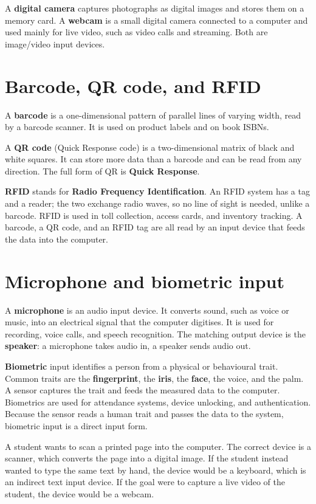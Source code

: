 A \textbf{digital camera} captures photographs as digital images and stores
them on a memory card. A \textbf{webcam} is a small digital camera connected
to a computer and used mainly for live video, such as video calls and
streaming. Both are image/video input devices.

\section{Barcode, QR code, and RFID}
A \textbf{barcode} is a one-dimensional pattern of parallel lines of varying
width, read by a barcode scanner. It is used on product labels and on book
ISBNs.

A \textbf{QR code} (Quick Response code) is a two-dimensional matrix of black
and white squares. It can store more data than a barcode and can be read from
any direction. The full form of QR is \textbf{Quick Response}.

\textbf{RFID} stands for \textbf{Radio Frequency Identification}. An RFID
system has a tag and a reader; the two exchange radio waves, so no line of
sight is needed, unlike a barcode. RFID is used in toll collection, access
cards, and inventory tracking. A barcode, a QR code, and an RFID tag are all
read by an input device that feeds the data into the computer.

\section{Microphone and biometric input}
A \textbf{microphone} is an audio input device. It converts sound, such as
voice or music, into an electrical signal that the computer digitises. It is
used for recording, voice calls, and speech recognition. The matching output
device is the \textbf{speaker}: a microphone takes audio in, a speaker sends
audio out.

\textbf{Biometric} input identifies a person from a physical or behavioural
trait. Common traits are the \textbf{fingerprint}, the \textbf{iris}, the
\textbf{face}, the voice, and the palm. A sensor captures the trait and feeds
the measured data to the computer. Biometrics are used for attendance
systems, device unlocking, and authentication. Because the sensor reads a
human trait and passes the data to the system, biometric input is a direct
input form.

\begin{example}
A student wants to scan a printed page into the computer. The correct device
is a scanner, which converts the page into a digital image. If the student
instead wanted to type the same text by hand, the device would be a keyboard,
which is an indirect text input device. If the goal were to capture a live
video of the student, the device would be a webcam.
\end{example}

